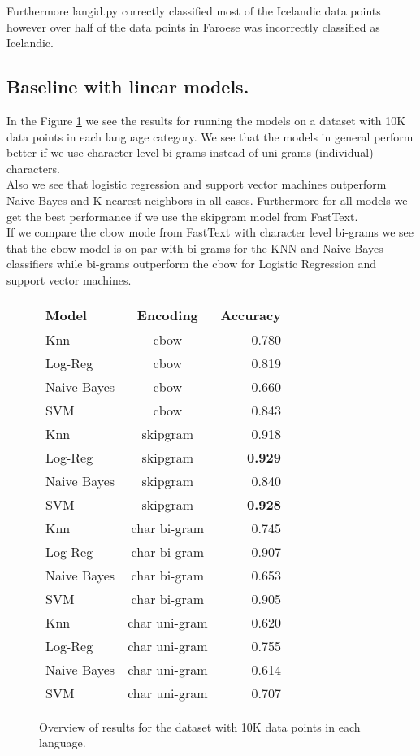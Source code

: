 Furthermore langid.py correctly classified most of the Icelandic data points however over half of the data points in Faroese was incorrectly classified as Icelandic.

\subsection{Baseline with linear models.}

In the Figure \ref{baseline-results-10k} we see the results for running the models on a dataset with 10K data points in each language category. We see that the models in general perform better if we use character level bi-grams instead of uni-grams (individual) characters.\\

Also we see that logistic regression and support vector machines outperform Naive Bayes and K nearest neighbors in all cases. Furthermore for all models we get the best performance if we use the skipgram model from FastText.\\

If we compare the cbow mode from FastText with character level bi-grams we see that the cbow model is on par with bi-grams for the KNN and Naive Bayes classifiers while bi-grams outperform the cbow for Logistic Regression and support vector machines.\\

\begin{figure}[h!]
  \centering
  \begin{tabular}{ l | c | r }
    \hline
    Model               & Encoding  & Accuracy \\
    \hline
    Knn                 & cbow &  0.780\\
    Log-Reg             & cbow &  0.819\\
    Naive Bayes         & cbow &  0.660\\
    SVM                 & cbow &  0.843\\
    Knn                 & skipgram &  0.918\\
    Log-Reg             & skipgram &  \textbf{0.929}\\
    Naive Bayes         & skipgram &  0.840\\
    SVM                 & skipgram &  \textbf{0.928}\\
    Knn                 & char bi-gram  & 0.745\\
    Log-Reg             & char bi-gram  & 0.907\\
    Naive Bayes         & char bi-gram  & 0.653\\
    SVM                 & char bi-gram  & 0.905\\
    Knn                 & char uni-gram  & 0.620\\
    Log-Reg             & char uni-gram  & 0.755\\
    Naive Bayes         & char uni-gram  & 0.614\\
    SVM                 & char uni-gram  & 0.707\\
    \hline
  \end{tabular}
  \caption{Overview of results for the dataset with 10K data points in each language.}
  \label{baseline-results-10k}
\end{figure}

